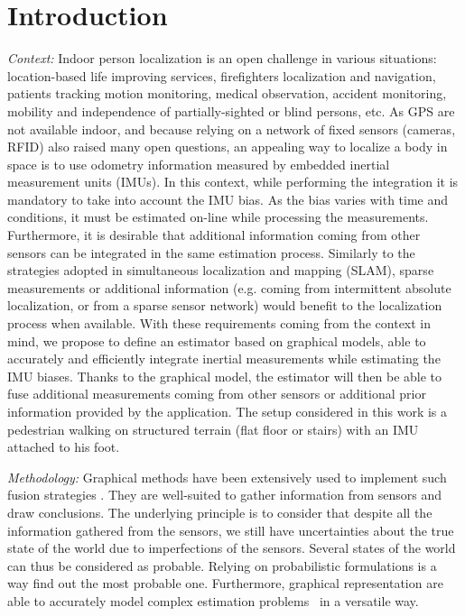 
\section{Introduction}\label{sec:intro}

\textit{Context: }
Indoor person localization is an open challenge in various situations: location-based life improving services,
firefighters localization and navigation, patients tracking 
motion monitoring, medical observation, accident monitoring, mobility and independence of partially-sighted or blind persons, etc.
As GPS are not available indoor, and because relying on a network of fixed sensors (cameras, RFID) also raised many open questions, an appealing way to localize a body in space is to use odometry information measured by embedded inertial measurement units (IMUs).
In this context, while performing the integration it is mandatory to take into account the IMU bias.
As the bias varies with time and conditions, it must be estimated on-line while processing the measurements.
Furthermore, it is desirable that additional information coming from other sensors can be integrated in the same estimation process.
Similarly to the strategies adopted in simultaneous localization and mapping (SLAM), sparse measurements or additional information (e.g. coming from intermittent absolute localization, or from a sparse sensor network) would benefit to the localization process when available.
With these requirements coming from the context in mind, we propose to define an estimator based on graphical models, able to accurately and efficiently integrate inertial measurements while estimating the IMU biases. Thanks to the graphical model, the estimator will then be able to fuse additional measurements coming from other sensors or additional prior information provided by the application.
The setup considered in this work  is a pedestrian walking on structured terrain (flat floor or stairs) with an IMU attached to his foot.


\textit{Methodology: }
Graphical methods have been extensively used to implement such fusion strategies \cite{Thrun:ijrr:2006,Kaess:itro:2008}.
They are well-suited to gather information from sensors
and draw conclusions. The underlying principle is to consider that despite all the information gathered from the sensors, we still have uncertainties about the true state of the world due to imperfections of the sensors.
Several states of the world can thus be considered as probable.
Relying on probabilistic formulations is a way find out the most probable one. Furthermore, graphical representation are able to accurately model 
complex estimation problems~\cite{koller2009probabilistic} in a versatile way. 


